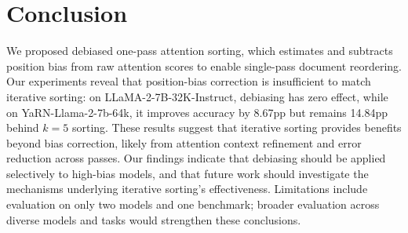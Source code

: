 \section{Conclusion}
\label{sec:conclusion}

We proposed debiased one-pass attention sorting, which estimates and subtracts position bias from raw attention scores to enable single-pass document reordering. Our experiments reveal that position-bias correction is insufficient to match iterative sorting: on LLaMA-2-7B-32K-Instruct, debiasing has zero effect, while on YaRN-Llama-2-7b-64k, it improves accuracy by 8.67pp but remains 14.84pp behind $k=5$ sorting. These results suggest that iterative sorting provides benefits beyond bias correction, likely from attention context refinement and error reduction across passes. Our findings indicate that debiasing should be applied selectively to high-bias models, and that future work should investigate the mechanisms underlying iterative sorting's effectiveness. Limitations include evaluation on only two models and one benchmark; broader evaluation across diverse models and tasks would strengthen these conclusions.
